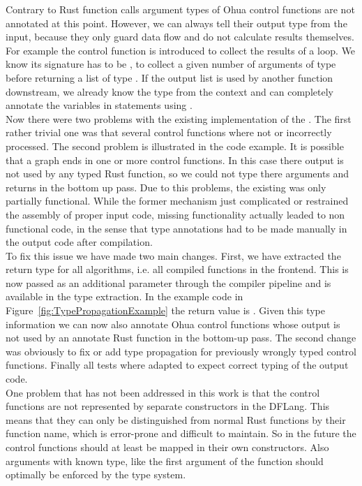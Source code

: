 Contrary to Rust function calls argument types of Ohua control functions are not annotated at this point. However, we can always tell their output type from the input, because they only guard data flow and do not calculate results themselves. For example the  control function is introduced to collect the results of a loop. We know its signature has to be , to collect a given number of arguments of type  before returning a list of type \code{[A]}. If the output list is used by another function downstream, we already know the type  from the context and can completely annotate the variables in statements using .\\

Now there were two problems with the existing implementation of the . The first rather trivial one was that several control functions where not or incorrectly processed. The second problem is illustrated in the  code example. It is possible that a graph ends in one or more control functions. In this case there output is not used by any typed Rust function, so we could not type there arguments and returns in the bottom up pass. Due to this problems, the existing  was only partially functional. While the former  mechanism just complicated or restrained the assembly of proper input code, missing  functionality actually leaded to non functional code, in the sense that type annotations had to be made manually in the output code after compilation.  \\

To fix this issue we have made two main changes. First, we have extracted the return type for all algorithms, i.e. all compiled functions in the frontend. This is now passed as an additional parameter through the compiler pipeline and is available in the type extraction. In the example code in Figure~\ref{fig:TypePropagationExample} the return value is . Given this type information we can now also annotate Ohua control functions whose output is not used by an annotate Rust function in the bottom-up pass. The second change was obviously to fix or add type propagation for previously wrongly typed control functions. Finally all tests where adapted to expect correct typing of the output code. \\

One problem that has not been addressed in this work is that the control functions are not represented by separate constructors in the DFLang. This means that they can only be distinguished from normal Rust functions by their function name, which is error-prone and difficult to maintain. So in the future the control functions should at least be mapped in their own constructors. Also arguments with known type, like the first argument of the function  should optimally be enforced by the type system. 


